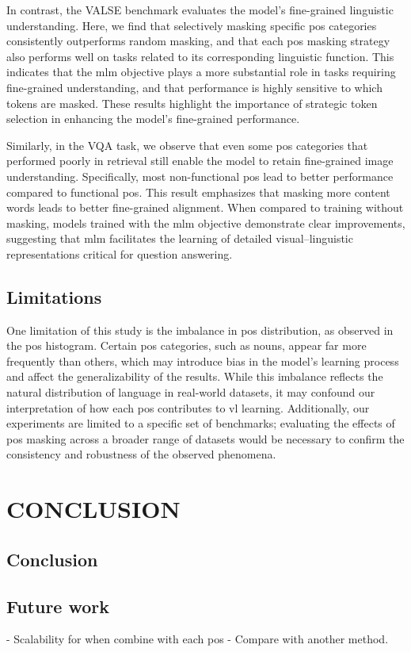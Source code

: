 In contrast, the VALSE benchmark evaluates the model's fine-grained linguistic understanding.
Here, we find that selectively masking specific \acrshort{pos} categories consistently outperforms random masking, and that each \acrshort{pos} masking strategy also performs well on tasks related to its corresponding linguistic function.
This indicates that the \acrshort{mlm} objective plays a more substantial role in tasks requiring fine-grained understanding, and that performance is highly sensitive to which tokens are masked.
These results highlight the importance of strategic token selection in enhancing the model’s fine-grained performance.

Similarly, in the VQA task, we observe that even some \acrshort{pos} categories that performed poorly in retrieval still enable the model to retain fine-grained image understanding.
Specifically, most non-functional \acrshort{pos} lead to better performance compared to functional \acrshort{pos}.
This result emphasizes that masking more content words leads to better fine-grained alignment.
When compared to training without masking, models trained with the \acrshort{mlm} objective demonstrate clear improvements, suggesting that \acrshort{mlm} facilitates the learning of detailed visual–linguistic representations critical for question answering.

\section{Limitations}
One limitation of this study is the imbalance in \acrshort{pos} distribution, as observed in the \acrshort{pos} histogram.
Certain \acrshort{pos} categories, such as nouns, appear far more frequently than others, which may introduce bias in the model’s learning process and affect the generalizability of the results.
While this imbalance reflects the natural distribution of language in real-world datasets, it may confound our interpretation of how each \acrshort{pos} contributes to \Acrshort{vl} learning.
Additionally, our experiments are limited to a specific set of benchmarks; evaluating the effects of \acrshort{pos} masking across a broader range of datasets would be necessary to confirm the consistency and robustness of the observed phenomena.

\chapter{CONCLUSION}
\section{Conclusion}
\section{Future work}
- Scalability for when combine with each pos
- Compare with another method.